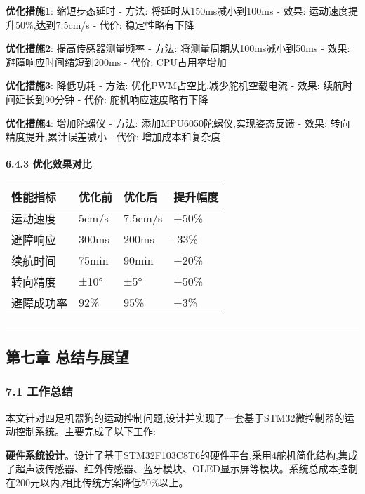 \documentclass[
]{article}
\begin{document}
\textbf{优化措施1}: 缩短步态延时 - 方法: 将延时从150ms减小到100ms -
效果: 运动速度提升50\%,达到7.5cm/s - 代价: 稳定性略有下降

\textbf{优化措施2}: 提高传感器测量频率 - 方法:
将测量周期从100ms减小到50ms - 效果: 避障响应时间缩短到200ms - 代价:
CPU占用率增加

\textbf{优化措施3}: 降低功耗 - 方法: 优化PWM占空比,减少舵机空载电流 -
效果: 续航时间延长到90分钟 - 代价: 舵机响应速度略有下降

\textbf{优化措施4}: 增加陀螺仪 - 方法: 添加MPU6050陀螺仪,实现姿态反馈 -
效果: 转向精度提升,累计误差减小 - 代价: 增加成本和复杂度

\hypertarget{ux4f18ux5316ux6548ux679cux5bf9ux6bd4}{%
\paragraph{6.4.3
优化效果对比}\label{ux4f18ux5316ux6548ux679cux5bf9ux6bd4}}

\begin{longtable}[]{@{}llll@{}}
\toprule
性能指标 & 优化前 & 优化后 & 提升幅度\tabularnewline
\midrule
\endhead
运动速度 & 5cm/s & 7.5cm/s & +50\%\tabularnewline
避障响应 & 300ms & 200ms & -33\%\tabularnewline
续航时间 & 75min & 90min & +20\%\tabularnewline
转向精度 & ±10° & ±5° & +50\%\tabularnewline
避障成功率 & 92\% & 95\% & +3\%\tabularnewline
\bottomrule
\end{longtable}

\begin{center}\rule{0.5\linewidth}{0.5pt}\end{center}

\hypertarget{ux7b2cux4e03ux7ae0-ux603bux7ed3ux4e0eux5c55ux671b}{%
\subsection{第七章
总结与展望}\label{ux7b2cux4e03ux7ae0-ux603bux7ed3ux4e0eux5c55ux671b}}

\hypertarget{ux5de5ux4f5cux603bux7ed3}{%
\subsubsection{7.1 工作总结}\label{ux5de5ux4f5cux603bux7ed3}}

本文针对四足机器狗的运动控制问题,设计并实现了一套基于STM32微控制器的运动控制系统。主要完成了以下工作:

\textbf{硬件系统设计}。设计了基于STM32F103C8T6的硬件平台,采用4舵机简化结构,集成了超声波传感器、红外传感器、蓝牙模块、OLED显示屏等模块。系统总成本控制在200元以内,相比传统方案降低50\%以上。
\end{document}
